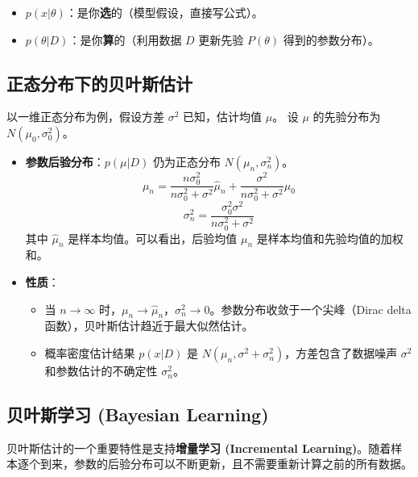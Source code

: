 \documentclass[a4paper, 11pt]{ctexart}
\begin{document}
\begin{important}[总结]
\begin{itemize}
    \item \textbf{$p(x|\theta)$}：是你\textbf{选}的（模型假设，直接写公式）。
    \item \textbf{$p(\theta|D)$}：是你\textbf{算}的（利用数据 $D$ 更新先验 $P(\theta)$ 得到的参数分布）。
\end{itemize}
\end{important}
\subsection{正态分布下的贝叶斯估计}
以一维正态分布为例，假设方差 $\sigma^2$ 已知，估计均值 $\mu$。
设 $\mu$ 的先验分布为 $N(\mu_0, \sigma_0^2)$。
\begin{itemize}
    \item \textbf{参数后验分布}：$p(\mu|D)$ 仍为正态分布 $N(\mu_n, \sigma_n^2)$。
    \begin{equation}
        \mu_n = \frac{n\sigma_0^2}{n\sigma_0^2 + \sigma^2}\hat{\mu}_n + \frac{\sigma^2}{n\sigma_0^2 + \sigma^2}\mu_0
    \end{equation}
    \begin{equation}
        \sigma_n^2 = \frac{\sigma_0^2 \sigma^2}{n\sigma_0^2 + \sigma^2}
    \end{equation}
    其中 $\hat{\mu}_n$ 是样本均值。可以看出，后验均值 $\mu_n$ 是样本均值和先验均值的加权和。
    \item \textbf{性质}：
    \begin{itemize}
        \item 当 $n \to \infty$ 时，$\mu_n \to \hat{\mu}_n$，$\sigma_n^2 \to 0$。参数分布收敛于一个尖峰（Dirac delta函数），贝叶斯估计趋近于最大似然估计。
        \item 概率密度估计结果 $p(x|D)$ 是 $N(\mu_n, \sigma^2 + \sigma_n^2)$，方差包含了数据噪声 $\sigma^2$ 和参数估计的不确定性 $\sigma_n^2$。
    \end{itemize}
\end{itemize}

\subsection{贝叶斯学习 (Bayesian Learning)}
贝叶斯估计的一个重要特性是支持\textbf{增量学习 (Incremental Learning)}。随着样本逐个到来，参数的后验分布可以不断更新，且不需要重新计算之前的所有数据。
\end{document}
